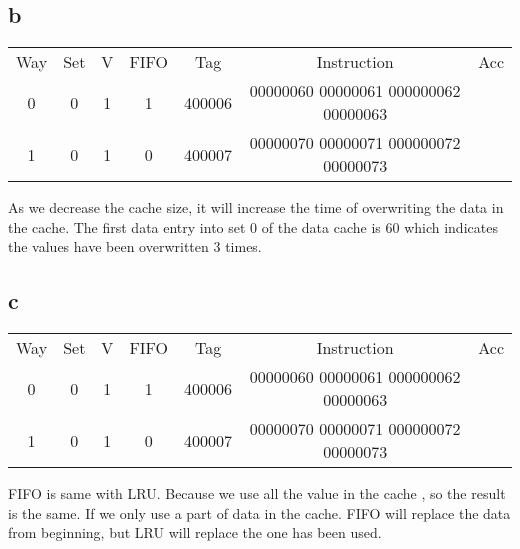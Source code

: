 \documentclass[]{article}
\begin{document}
\subsection*{b}
\begin{center}
	\begin{tabular}{c c c c c c c}
	     Way & Set & V & FIFO & Tag & Instruction & Acc \\
	     0   &	0 & 1 & 1 & 400006 & 00000060 00000061 000000062 00000063&\\
	     1   &  0 & 1 & 0 & 400007 & 00000070 00000071 000000072 00000073&\\
	\end{tabular}
\end{center}
As we decrease the cache size, it will increase the time of overwriting the data in the cache.\newline 
The first data entry into set 0 of the data cache is 60  which indicates the values have been overwritten 3 times. 
\subsection*{c}
\begin{center}
	\begin{tabular}{c c c c c c c}
		Way &Set & V & FIFO & Tag & Instruction & Acc \\
	     0&	0 & 1 & 1 & 400006 & 00000060 00000061 000000062 00000063&\\
	     1& 0 & 1 & 0 & 400007 & 00000070 00000071 000000072 00000073&\\
	\end{tabular}

\end{center}
FIFO is same with LRU. Because we use all the value in the cache , so the result is the same. If we only use a part of data in the cache. FIFO will replace the data from beginning, but LRU will replace the one has been used.\newline
\end{document}
